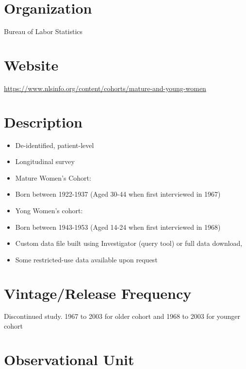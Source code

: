 \documentclass[
]{book}
\providecommand{\tightlist}{%
  \setlength{\itemsep}{0pt}\setlength{\parskip}{0pt}}
\begin{document}
\hypertarget{organization-55}{%
\section{Organization}\label{organization-55}}

Bureau of Labor Statistics

\hypertarget{website-55}{%
\section{Website}\label{website-55}}

\url{https://www.nlsinfo.org/content/cohorts/mature-and-young-women}

\hypertarget{description-55}{%
\section{Description}\label{description-55}}

\begin{itemize}
\tightlist
\item
  De-identified, patient-level
\item
  Longitudinal survey
\item
  Mature Women's Cohort:
\item
  Born between 1922-1937 (Aged 30-44 when first interviewed in 1967)
\item
  Yong Women's cohort:
\item
  Born between 1943-1953 (Aged 14-24 when first interviewed in 1968)
\item
  Custom data file built using Investigator (query tool) or full data download,
\item
  Some restricted-use data available upon request
\end{itemize}

\hypertarget{vintagerelease-frequency-55}{%
\section{Vintage/Release Frequency}\label{vintagerelease-frequency-55}}

Discontinued study. 1967 to 2003 for older cohort and 1968 to 2003 for younger cohort

\hypertarget{observational-unit-55}{%
\section{Observational Unit}\label{observational-unit-55}}
\end{document}

